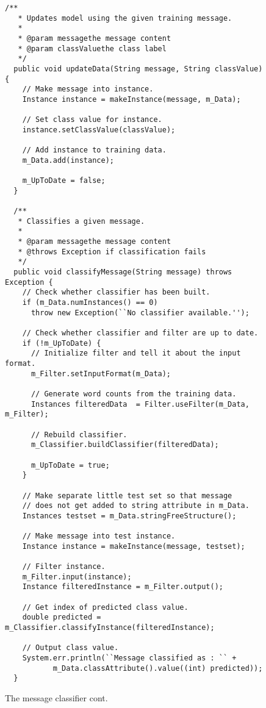\begin{figure}[!thp]
\ContinuedFloat
\begin{mdframed}[innermargin=-1cm]
\begin{Verbatim}[fontsize=\footnotesize]
  /**
   * Updates model using the given training message.
   *
   * @param messagethe message content
   * @param classValuethe class label
   */
  public void updateData(String message, String classValue) {
    // Make message into instance.
    Instance instance = makeInstance(message, m_Data);

    // Set class value for instance.
    instance.setClassValue(classValue);

    // Add instance to training data.
    m_Data.add(instance);

    m_UpToDate = false;
  }

  /**
   * Classifies a given message.
   *
   * @param messagethe message content
   * @throws Exception if classification fails
   */
  public void classifyMessage(String message) throws Exception {
    // Check whether classifier has been built.
    if (m_Data.numInstances() == 0)
      throw new Exception(``No classifier available.'');

    // Check whether classifier and filter are up to date.
    if (!m_UpToDate) {
      // Initialize filter and tell it about the input format.
      m_Filter.setInputFormat(m_Data);

      // Generate word counts from the training data.
      Instances filteredData  = Filter.useFilter(m_Data, m_Filter);

      // Rebuild classifier.
      m_Classifier.buildClassifier(filteredData);

      m_UpToDate = true;
    }

    // Make separate little test set so that message
    // does not get added to string attribute in m_Data.
    Instances testset = m_Data.stringFreeStructure();

    // Make message into test instance.
    Instance instance = makeInstance(message, testset);

    // Filter instance.
    m_Filter.input(instance);
    Instance filteredInstance = m_Filter.output();

    // Get index of predicted class value.
    double predicted = m_Classifier.classifyInstance(filteredInstance);

    // Output class value.
    System.err.println(``Message classified as : `` +
           m_Data.classAttribute().value((int) predicted));
  }
\end{Verbatim}
\end{mdframed}
\caption{\label{fig:message_classifier}The message classifier cont.}
\end{figure}

